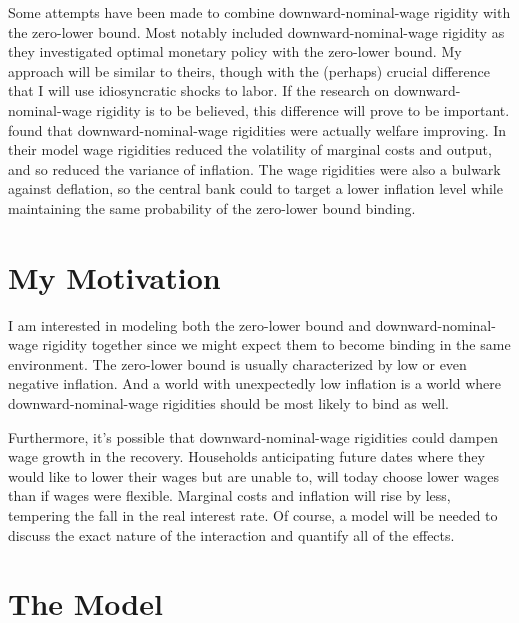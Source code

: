 \documentclass[12pt,a4paper]{article}            %
\begin{document}
Some attempts have been made to combine downward-nominal-wage rigidity with the zero-lower bound.
Most notably \cite{coibon_gorodnichenko_wieland_2012} included downward-nominal-wage rigidity as they investigated optimal monetary policy with the zero-lower bound.
My approach will be similar to theirs, though with the (perhaps) crucial difference that I will use idiosyncratic shocks to labor.
If the research on downward-nominal-wage rigidity is to be believed, this difference will prove to be important.
\cite{coibon_gorodnichenko_wieland_2012} found that downward-nominal-wage rigidities were actually welfare improving.
In their model wage rigidities reduced the volatility of marginal costs and output, and so reduced the variance of inflation.
The wage rigidities were also a bulwark against deflation, so the central bank could to target a lower inflation level while maintaining the same probability of the zero-lower bound binding.
\section{My Motivation}
\label{sec:my_motivation}


I am interested in modeling both the zero-lower bound and downward-nominal-wage rigidity together since we might expect them to become binding in the same environment.
The zero-lower bound is usually characterized by low or even negative inflation.
And a world with unexpectedly low inflation is a world where downward-nominal-wage rigidities should be most likely to bind as well.

Furthermore, it's possible that downward-nominal-wage rigidities could dampen wage growth in the recovery.
Households anticipating future dates where they would like to lower their wages but are unable to, will today choose lower wages than if wages were flexible.
Marginal costs and inflation will rise by less, tempering the fall in the real interest rate.
Of course, a model will be needed to discuss the exact nature of the interaction and quantify all of the effects.

\section{The Model}
\label{sec:the_model}
\end{document}
